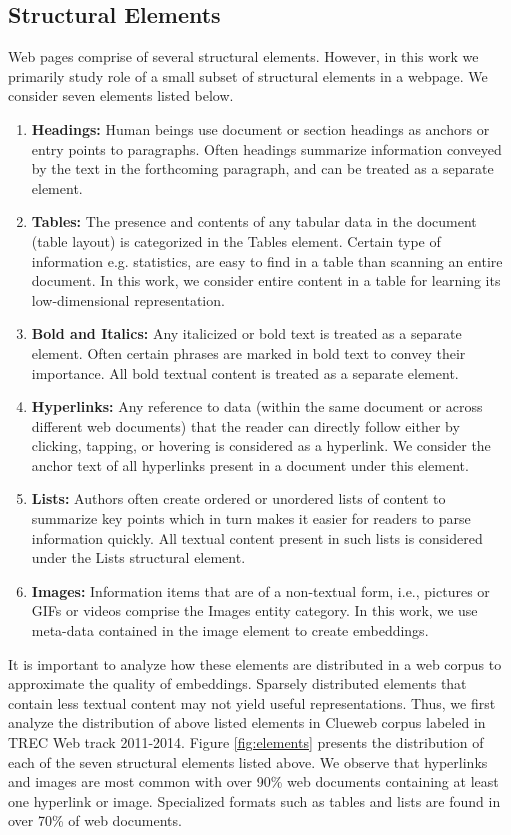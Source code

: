\documentclass[runningheads,a4paper]{llncs}
\begin{document}
\subsection{Structural Elements}
Web pages comprise of several structural elements. However, in this work we primarily study 
role of a small subset of structural elements in a webpage. We consider seven elements 
listed below.
\begin{enumerate}
\item \textbf{Headings:} Human beings use document or section headings as anchors 
or entry points \cite{} to paragraphs. Often headings summarize information conveyed by 
the text in the forthcoming paragraph, and can be treated as a separate element. 
\item \textbf{Tables:} The presence and contents of any tabular data in the 
document (table layout) is categorized in the Tables element. Certain type of 
information e.g. statistics, are easy to find in a table than scanning an  
entire document. In this work, we consider entire content in a table for learning 
its low-dimensional representation.
\item \textbf{Bold and Italics:} Any italicized or bold text is treated as a separate element. Often 
certain phrases are marked in bold text to convey their importance. 
All bold textual content is treated as a separate element.
\item \textbf{Hyperlinks:} Any reference to data (within the same document or 
across different web documents) that the reader can directly follow either by 
clicking, tapping, or hovering is considered as a hyperlink. We consider the 
anchor text of all hyperlinks present in a document under this element.
\item \textbf{Lists:} Authors often create ordered or unordered lists of content to summarize key points 
which in turn makes it easier for readers to parse information quickly. All textual 
content present in such lists is considered under the Lists structural element.
\item \textbf{Images:} Information items that are of a non-textual form, i.e., 
pictures or GIFs or videos comprise the Images entity category. In this work, we use meta-data 
contained in the image element to create embeddings. 
\end{enumerate}

It is important to analyze how these elements are distributed in a web corpus 
to approximate the quality of embeddings. Sparsely distributed elements that contain 
less textual content may not yield useful representations. Thus, we 
first analyze the distribution of above listed elements in Clueweb corpus labeled in 
TREC Web track 2011-2014. 
Figure \ref{fig:elements} presents the distribution of each of the seven 
structural elements listed above. We observe that hyperlinks and images are most 
common with over 90\% web documents containing at least one hyperlink or image. 
Specialized formats such as tables and lists are found in over 70\% of web 
documents.
\end{document}
